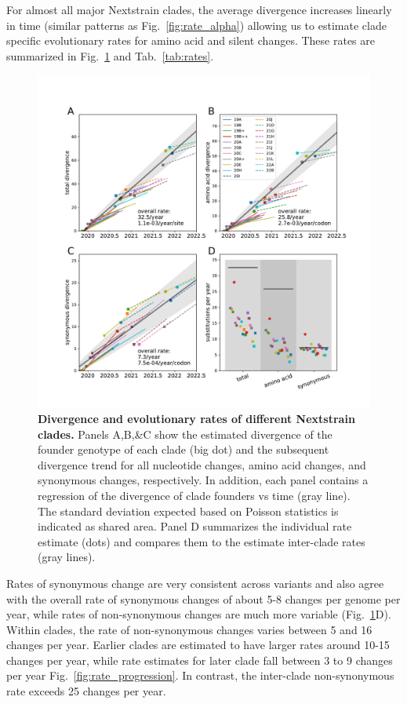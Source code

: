 \documentclass[aps,rmp, twocolumn]{revtex4}
\begin{document}
For almost all major Nextstrain clades, the average divergence increases linearly in time (similar patterns as Fig.~\ref{fig:rate_alpha}) allowing us to estimate clade specific evolutionary rates for amino acid and silent changes.
These rates are summarized in Fig.~\ref{fig:rate_summary} and Tab.~\ref{tab:rates}.

\begin{figure}
    \includegraphics[width=\textwidth]{figures/rate_summary.pdf}
    \caption[]{{\bf Divergence and evolutionary rates of different Nextstrain clades.} Panels A,B,\&C show the estimated divergence of the founder genotype of each clade (big dot) and the subsequent divergence trend for all nucleotide changes, amino acid changes, and synonymous changes, respectively. In addition, each panel contains a regression of the divergence of clade founders vs time (gray line).
    The standard deviation expected based on Poisson statistics is indicated as shared area.
    Panel D summarizes the individual rate estimate (dots) and compares them to the estimate inter-clade rates (gray lines).
    \label{fig:rate_summary} }
\end{figure}

Rates of synonymous change are very consistent across variants and also agree with the overall rate of synonymous changes of about 5-8 changes per genome per year, while rates of non-synonymous changes are much more variable (Fig.~\ref{fig:rate_summary}D).
Within clades, the rate of non-synonymous changes varies between 5 and 16 changes per year.
Earlier clades are estimated to have larger rates around 10-15 changes per year, while rate estimates for later clade fall  between 3 to 9 changes per year Fig.~\ref{fig:rate_progression}.
In contrast, the inter-clade non-synonymous rate exceeds 25 changes per year.
\end{document}
